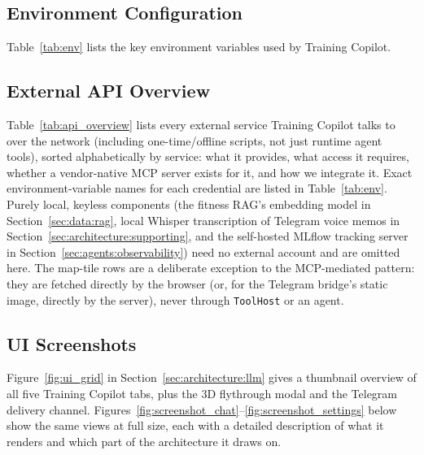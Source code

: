 



\FloatBarrier
\subsection{Environment Configuration}\label{sec:appendix:env}

Table~\ref{tab:env} lists the key environment variables used by Training Copilot.



\FloatBarrier
\subsection{External API Overview}\label{sec:appendix:apis}

Table~\ref{tab:api_overview} lists every external service Training Copilot talks to over the network (including one-time/offline scripts, not just runtime agent tools), sorted alphabetically by service: what it provides, what access it requires, whether a vendor-native MCP server exists for it, and how we integrate it. Exact environment-variable names for each credential are listed in Table~\ref{tab:env}. Purely local, keyless components (the fitness RAG's embedding model in Section~\ref{sec:data:rag}, local Whisper transcription of Telegram voice memos in Section~\ref{sec:architecture:supporting}, and the self-hosted MLflow tracking server in Section~\ref{sec:agents:observability}) need no external account and are omitted here. The map-tile rows are a deliberate exception to the MCP-mediated pattern: they are fetched directly by the browser (or, for the Telegram bridge's static image, directly by the server), never through \texttt{ToolHost} or an agent.



\FloatBarrier
\subsection{UI Screenshots}\label{sec:appendix:screenshots}

Figure~\ref{fig:ui_grid} in Section~\ref{sec:architecture:llm} gives a thumbnail overview of all five Training Copilot tabs, plus the 3D flythrough modal and the Telegram delivery channel. Figures~\ref{fig:screenshot_chat}--\ref{fig:screenshot_settings} below show the same views at full size, each with a detailed description of what it renders and which part of the architecture it draws on.
















